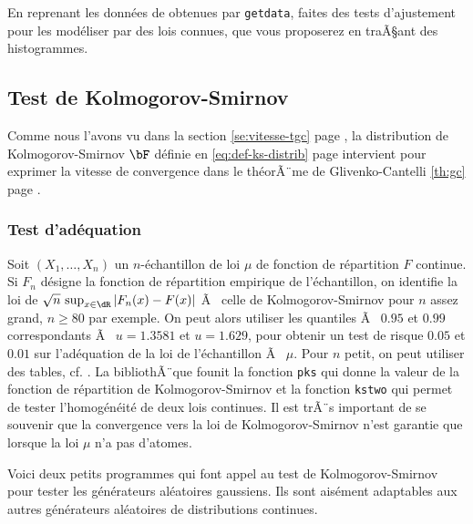\begin{exo}
  En reprenant les données de \SB{} obtenues par \texttt{getdata}, faites des
  tests d'ajustement pour les modéliser par des lois connues, que vous
  proposerez en traÃ§ant des histogrammes.
\end{exo}


%
\subsection{Test de Kolmogorov-Smirnov}\label{ss:test-ks}
%

Comme nous l'avons vu dans la section \ref{se:vitesse-tgc} page
\pageref{se:vitesse-tgc}, la distribution de Kolmogorov-Smirnov $\bF$ définie
en \eqref{eq:def-ks-distrib} page \pageref{eq:def-ks-distrib} intervient pour
exprimer la vitesse de convergence dans le théorÃ¨me de Glivenko-Cantelli
\ref{th:gc} page \pageref{th:gc}.

\subsubsection{Test d'adéquation}

Soit $(X_1,\ldots,X_n)$ un $n$-échantillon de loi $\mu$ de fonction de répartition
$F$ continue. Si $F_n$ désigne la fonction de répartition empirique de
l'échantillon, on identifie la loi de $\sqrt{n}\,\sup _{x \in \dR}
|F_n(x)-F(x)|$ Ã  celle de Kolmogorov-Smirnov pour $n$ assez grand, $n \geq 80$
par exemple. On peut alors utiliser les quantiles Ã  $0.95$ et $0.99$
correspondants Ã  $u=1.3581$ et $u=1.629$, pour obtenir un test de risque
$0.05$ et $0.01$ sur l'adéquation de la loi de l'échantillon Ã  $\mu$. Pour $n$
petit, on peut utiliser des tables, cf. \cite{saporta}.  La bibliothÃ¨que \SB{}
founit la fonction \texttt{pks} qui donne la valeur de la fonction de
répartition de Kolmogorov-Smirnov et la fonction \texttt{kstwo} qui permet de
tester l'homogénéité de deux lois continues. Il est trÃ¨s important de se
souvenir que la convergence vers la loi de Kolmogorov-Smirnov n'est garantie
que lorsque la loi $\mu$ n'a pas d'atomes.

\begin{exo}
  Voici deux petits programmes \ML{} qui font appel au test de
  Kolmogorov-Smirnov pour tester les générateurs aléatoires gaussiens. Ils
  sont aisément adaptables aux autres générateurs aléatoires de distributions
  continues.
\end{exo}


